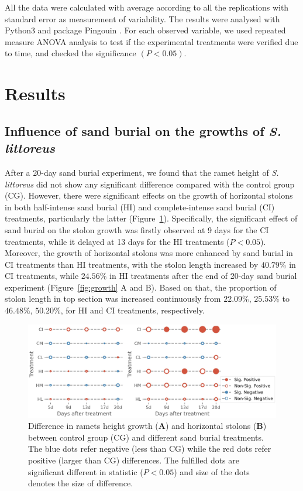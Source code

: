 \documentclass[]{interact}
\theoremstyle{plain}%
\theoremstyle{definition}
\theoremstyle{remark}
\begin{document}
All the data were calculated with average according to all the replications with standard error as measurement of variability. The results were analysed with Python3 and package Pingouin \citep{vallatPingouinstatisticsPython2018}. For each observed variable, we used repeated measure ANOVA analysis to test if the experimental treatments were verified due to time, and checked the significance $(P<0.05)$.

\section{Results}

\subsection{Influence of sand burial on the growths of \textit{S. littoreus}}

After a 20-day sand burial experiment, we found that the ramet height of \textit{S. littoreus} did not show any significant difference compared with the control group (CG). However, there were significant effects on the growth of horizontal stolons in both half-intense sand burial (HI) and complete-intense sand burial (CI) treatments, particularly the latter (Figure~\ref{fig:lattice}). 
Specifically, the significant effect of sand burial on the stolon growth was firstly observed at 9 days for the CI treatments, while it delayed at 13 days for the HI treatments ($P<0.05$).
Moreover, the growth of horizontal stolons was more enhanced by sand burial in CI treatments than HI treatments, with the stolon length increased by $40.79\%$ in CI treatments, while $24.56\%$ in HI treatments after the end of 20-day sand burial experiment (Figure~\ref{fig:growth} A and B).
Based on that, the proportion of stolon length in top section was increased continuously from $22.09\%$, $25.53\%$ to $46.48\%$, $50.20\%$, for HI and CI treatments, respectively.

\begin{figure}[!h]
  \centering
  \includegraphics[scale=0.7]{../figs/grid_differences.jpg}
  \caption{
    Difference in ramets height growth (\textbf{A}) and horizontal stolons (\textbf{B}) between control group (CG) and different sand burial treatments. The blue dots refer negative (less than CG) while the red dots refer positive (larger than CG) differences. The fulfilled dots are significant different in statistic ($P<0.05$) and size of the dots denotes the size of difference.  
  } 
  \label{fig:lattice}
\end{figure}
\end{document}
